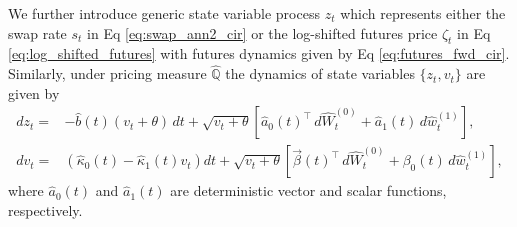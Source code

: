 \documentclass[pdftex,11pt,a4paper] {article}
\begin{document}
We further introduce generic state variable process $z_t$ which represents either the swap rate $s_t$ in Eq \eqref{eq:swap_ann2_cir} or the log-shifted futures price $\zeta_t$ in Eq \eqref{eq:log_shifted_futures} with futures dynamics given by Eq \eqref{eq:futures_fwd_cir}. Similarly, under pricing measure $\mathbb{\hat Q}$ the dynamics of state variables $\{z_t, v_t\}$ are given by
\begin{equation}\label{eq:price_process_cir}
\begin{split}
dz_t=&-\hat b(t)(v_t+\theta)\,dt+\sqrt{v_t+\theta}\left[\hat a_0(t)^\top\,d\hat W^{(0)}_t+\hat a_1(t)\,d\hat w^{(1)}_t\right],\\
dv_t=&(\hat\kappa_0(t)-\hat\kappa_1(t) v_t)dt+\sqrt{v_t+\theta}\left[\vec{\beta}(t)^\top \,d\hat W^{(0)}_t+\beta_0(t)\,d\hat w^{(1)}_t\right],
\end{split}
\end{equation}
where $\hat a_0(t)$ and $\hat a_1(t)$ are deterministic vector and scalar functions, respectively. 
\end{document}
